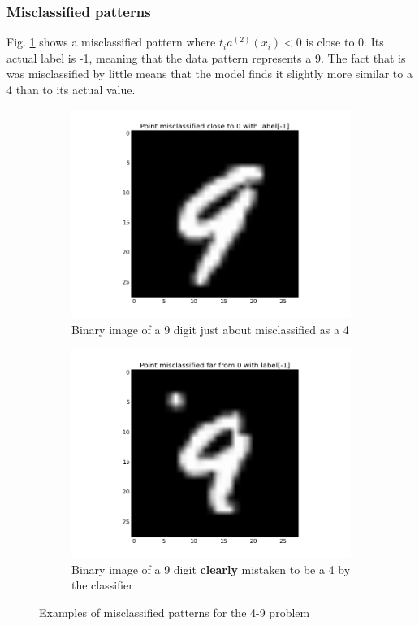 	\subsubsection{Misclassified patterns}
	Fig. \ref{subfig:misclass_3} shows a misclassified pattern where $t_i a^{(2)}(x_i)<0$ is close to 0. Its actual label is -1, meaning that the data pattern represents a 9. The fact that is was misclassified by little means that the model finds it slightly more similar to a 4 than to its actual value.
	\begin{figure}[!ht]
	\centering
	\begin{subfigure}[b]{.45\textwidth}
	\centering
	\includegraphics[width=\textwidth]{mlp/plots/misclassified_fig3.png}
	\caption{Binary image of a 9 digit just about misclassified as a 4}
	\label{subfig:misclass_3}
	\end{subfigure}
	\quad
	\begin{subfigure}[b]{.45\textwidth}
	\centering
	\includegraphics[width=\textwidth]{mlp/plots/misclassified_fig4.png}
	\caption{Binary image of a 9 digit \textbf{clearly} mistaken to be a 4 by the classifier}
	\label{subfig:misclass_4}
	\end{subfigure}
	\caption{Examples of misclassified patterns for the 4-9 problem}
	\label{fig:misclassification}
	\end{figure}
